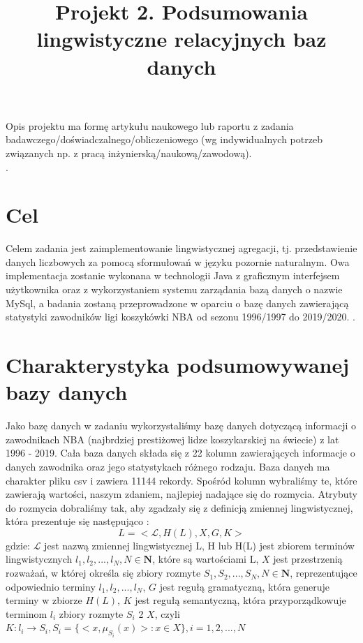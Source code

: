 \documentclass{classrep}
\author{
  \studentinfo{Hubert Gawłowski}{224298} \and
  \studentinfo{Kamil Kiszko-Zgierski}{224328} }
\title{Projekt 2.  Podsumowania lingwistyczne relacyjnych baz danych}
\begin{document}
\maketitle

Opis projektu ma formę artykułu naukowego lub raportu z zadania
badawczego/doświadczalnego/obliczeniowego (wg indywidualnych potrzeb związanych np. z
pracą inżynierską/naukową/zawodową). \\
. 

\section{Cel}
Celem zadania jest zaimplementowanie lingwistycznej agregacji, tj. przedstawienie danych liczbowych za pomocą sformułowań w języku pozornie naturalnym. Owa implementacja zostanie wykonana w technologii Java z graficznym interfejsem użytkownika oraz z wykorzystaniem systemu zarządania bazą danych o nazwie MySql, a badania zostaną przeprowadzone w oparciu o bazę danych zawierającą statystyki zawodników ligi koszykówki NBA od sezonu 1996/1997 do 2019/2020.
\cite{nba_data}.  \\


\section{Charakterystyka podsumowywanej bazy danych}

Jako bazę danych w zadaniu wykorzystaliśmy bazę danych dotyczącą informacji o zawodnikach NBA (najbrdziej prestiżowej lidze koszykarskiej na świecie) z lat 1996 - 2019. Cała baza danych składa się z 22 kolumn zawierających informacje o danych zawodnika oraz jego statystykach różnego rodzaju. Baza danych ma charakter pliku csv i zawiera 11144 rekordy. Spośród kolumn wybraliśmy te, które zawierają wartości, naszym zdaniem, najlepiej nadające się do rozmycia. Atrybuty do rozmycia dobraliśmy tak, aby zgadzały się z definicją zmiennej lingwistycznej, która prezentuje się następująco \cite{niewiadomski19}: 
\begin{equation}
    L=<\mathcal{L}, H(L), X, G, K>
    \label{eqn_zmienna_lingwistyczna}
\end{equation}
gdzie: \newline $\mathcal{L}$ jest nazwą zmiennej lingwistycznej L, \newline H lub H(L) jest zbiorem terminów lingwistycznych $l_1, l_2, ..., l_N, N \in \mathbf{N}$, które są wartościami L, \newline $X$ jest przestrzenią rozważań, w której określa się zbiory rozmyte $S_1, S_2,..., S_N, N \in \mathbf{N}$, reprezentujące odpowiednio terminy $l_1, l_2, ..., l_N$, \newline $G$ jest regułą gramatyczną, która generuje terminy w zbiorze $H(L)$, \newline $K$ jest regułą semantyczną, która przyporządkowuje terminom $l_i$ zbiory rozmyte $S_i$ 2 $X$, czyli $K : l_i \rightarrow S_i, S_i = \{<x,\mu_{S_i}(x)> : x \in X \}, i = 1,2,...,N$
\end{document}
